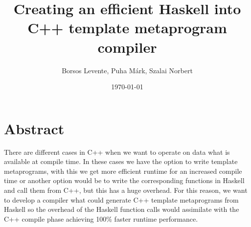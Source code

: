 \documentclass{article}
\title{Creating an efficient Haskell into C++ template metaprogram compiler}
\date{\today}
\author{Borsos Levente, Puha Márk, Szalai Norbert}
\begin{document}
  \maketitle
  \newpage


\section*{Abstract}

There are different cases in C++ when we want to operate on data what is available at compile time. In these cases we have the option to write template metaprograms, with this we get more efficient runtime for an increased compile time or another option would be to write the corresponding functions in Haskell and call them from C++, but this has a huge overhead.  For this reason, we want to develop a compiler what could generate  C++ template metaprograms from Haskell so the overhead of the Haskell function calls would assimilate with the C++ compile phase achieving 100\% faster runtime performance.
\end{document}
